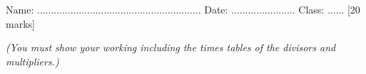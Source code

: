 \documentclass{article}
\date{}
\begin{document}
\fontsize{13}{15} \selectfont %

\begin{center}
  \qquad \\ 
\end{center} \\ 

Name: ...........................................................  \hspace{0.5cm}  Date: ....................... \hspace{0.5cm}  Class: ......\hspace{0.5cm} [20 marks]

\par
\vspace*{5pt} 
\textit{(You must show your working including the times tables of the divisors and multipliers.)  }
\vspace{5pt}
\end{document}
